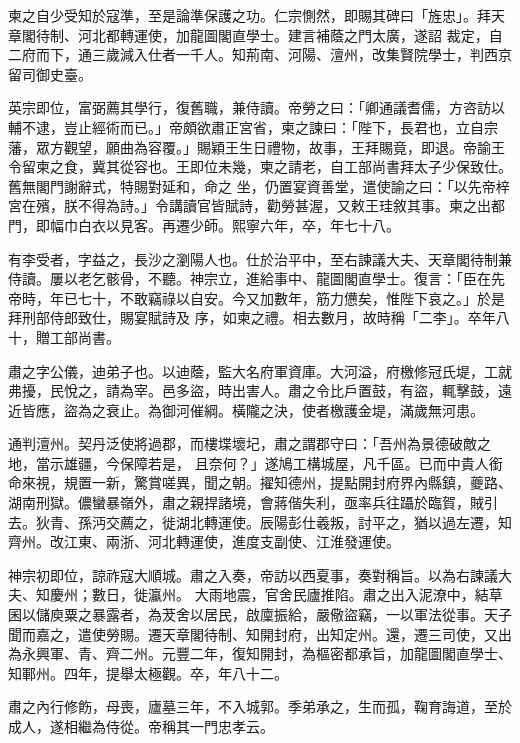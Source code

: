 \begin{pinyinscope}
 柬之自少受知於寇準，至是論準保護之功。仁宗惻然，即賜其碑曰「旌忠」。拜天章閣待制、河北都轉運使，加龍圖閣直學士。建言補蔭之門太廣，遂詔
 裁定，自二府而下，通三歲減入仕者一千人。知荊南、河陽、澶州，改集賢院學士，判西京留司御史臺。



 英宗即位，富弼薦其學行，復舊職，兼侍讀。帝勞之曰：「卿通議耆儒，方咨訪以輔不逮，豈止經術而已。」帝頗欲肅正宮省，柬之諫曰：「陛下，長君也，立自宗藩，眾方觀望，願曲為容覆。」賜穎王生日禮物，故事，王拜賜竟，即退。帝諭王令留柬之食，冀其從容也。王即位未幾，柬之請老，自工部尚書拜太子少保致仕。舊無閣門謝辭式，特賜對延和，命之
 坐，仍置宴資善堂，遣使諭之曰：「以先帝梓宮在殯，朕不得為詩。」令講讀官皆賦詩，勸勞甚渥，又敕王珪敘其事。柬之出都門，即幅巾白衣以見客。再遷少師。熙寧六年，卒，年七十八。



 有李受者，字益之，長沙之瀏陽人也。仕於治平中，至右諫議大夫、天章閣待制兼侍讀。屢以老乞骸骨，不聽。神宗立，進給事中、龍圖閣直學士。復言：「臣在先帝時，年已七十，不敢竊祿以自安。今又加數年，筋力憊矣，惟陛下哀之。」於是拜刑部侍郎致仕，賜宴賦詩及
 序，如柬之禮。相去數月，故時稱「二李」。卒年八十，贈工部尚書。



 肅之字公儀，迪弟子也。以迪蔭，監大名府軍資庫。大河溢，府檄修冠氏堤，工就弗擾，民悅之，請為宰。邑多盜，時出害人。肅之令比戶置鼓，有盜，輒擊鼓，遠近皆應，盜為之衰止。為御河催綱。橫隴之決，使者檄護金堤，滿歲無河患。



 通判澶州。契丹泛使將過郡，而樓堞壞圮，肅之謂郡守曰：「吾州為景德破敵之地，當示雄疆，今保障若是，
 且奈何？」遂鳩工構城屋，凡千區。已而中貴人銜命來視，規置一新，驚賞嗟異，聞之朝。擢知德州，提點開封府界內縣鎮，夔路、湖南刑獄。儂蠻暴嶺外，肅之親捍諸境，會蔣偕失利，亟率兵往躡於臨賀，賊引去。狄青、孫沔交薦之，徙湖北轉運使。辰陽彭仕羲叛，討平之，猶以過左遷，知齊州。改江東、兩浙、河北轉運使，進度支副使、江淮發運使。



 神宗初即位，諒祚寇大順城。肅之入奏，帝訪以西夏事，奏對稱旨。以為右諫議大夫、知慶州；數日，徙瀛州。
 大雨地震，官舍民廬推陷。肅之出入泥潦中，結草囷以儲庾粟之暴露者，為茇舍以居民，啟廩振給，嚴儆盜竊，一以軍法從事。天子聞而嘉之，遣使勞賜。遷天章閣待制、知開封府，出知定州。還，遷三司使，又出為永興軍、青、齊二州。元豐二年，復知開封，為樞密都承旨，加龍圖閣直學士、知鄆州。四年，提舉太極觀。卒，年八十二。



 肅之內行修飭，母喪，廬墓三年，不入城郭。季弟承之，生而孤，鞠育誨道，至於成人，遂相繼為侍從。帝稱其一門忠孝云。




\end{pinyinscope}
